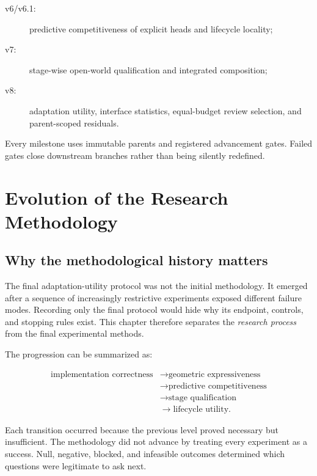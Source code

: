 \documentclass[12pt,oneside]{report}
\begin{document}
\begin{description}
\item[v6/v6.1:] predictive competitiveness of explicit heads and lifecycle
locality;
\item[v7:] stage-wise open-world qualification and integrated composition;
\item[v8:] adaptation utility, interface statistics, equal-budget review
selection, and parent-scoped residuals.
\end{description}

Every milestone uses immutable parents and registered advancement gates.
Failed gates close downstream branches rather than being silently redefined.

\chapter{Evolution of the Research Methodology}

\section{Why the methodological history matters}

The final adaptation-utility protocol was not the initial methodology. It
emerged after a sequence of increasingly restrictive experiments exposed
different failure modes. Recording only the final protocol would hide why its
endpoint, controls, and stopping rules exist. This chapter therefore separates
the \emph{research process} from the final experimental methods.

The progression can be summarized as:

\begin{equation}
\begin{aligned}
\text{implementation correctness}
&\rightarrow \text{geometric expressiveness}\\
&\rightarrow \text{predictive competitiveness}\\
&\rightarrow \text{stage qualification}\\
&\rightarrow \text{lifecycle utility}.
\end{aligned}
\end{equation}

Each transition occurred because the previous level proved necessary but
insufficient. The methodology did not advance by treating every experiment as
a success. Null, negative, blocked, and infeasible outcomes determined which
questions were legitimate to ask next.
\end{document}
